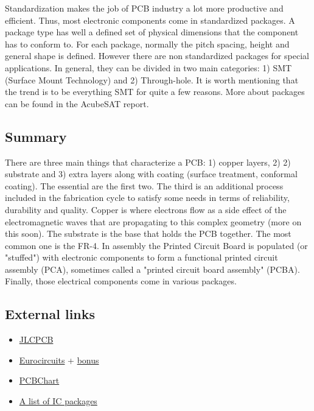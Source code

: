 \documentclass[final]{cubedoc}
\begin{document}
	Standardization makes the job of PCB industry a lot more productive and efficient. Thus, most electronic components come in standardized packages. A package type has well a defined set of physical dimensions that the component has to conform to. For each package, normally the pitch spacing, height and general shape is defined. However there are non standardized packages for special applications. In general, they can be divided in two main categories: 1) SMT (Surface Mount Technology) and 2) Through-hole. It is worth mentioning that the trend is to be everything SMT for quite a few reasons. More about packages can be found in the AcubeSAT report.
	
	
	\subsection{Summary}
	
	There are three main things that characterize a PCB: 1) copper layers, 2) 2) substrate and 3) extra layers along with coating (surface treatment, conformal coating). The essential are the first two. The third is an additional process included in the fabrication cycle to satisfy some needs in terms of reliability, durability and quality. Copper is where electrons flow as a side effect of the electromagnetic waves that are propagating to this complex geometry (more on this soon). The substrate is the base that holds the PCB together. The most common one is the FR-4. In assembly the Printed Circuit Board is populated (or "stuffed") with electronic components to form a functional printed circuit assembly (PCA), sometimes called a "printed circuit board assembly" (PCBA). Finally, those electrical components come in various packages. 
	
	
	
	\subsection{External links} %
	
	\begin{itemize}
		\item \href{https://www.youtube.com/watch?v=ljOoGyCso8s&t=311s}{JLCPCB}
		\item \href{https://www.eurocircuits.com/making-a-pcb-pcb-manufacture-step-by-step/}{Eurocircuits} + \href{https://www.youtube.com/watch?v=sIV0icM_Ujo&t=436s}{bonus}
		\item \href{https://www.pcbcart.com/article/content/PCB-manufacturing-process.html}{PCBChart}
		\item \href{https://en.wikipedia.org/wiki/List_of_integrated_circuit_packaging_types}{A list of IC packages}
	\end{itemize}
	
\end{document}
